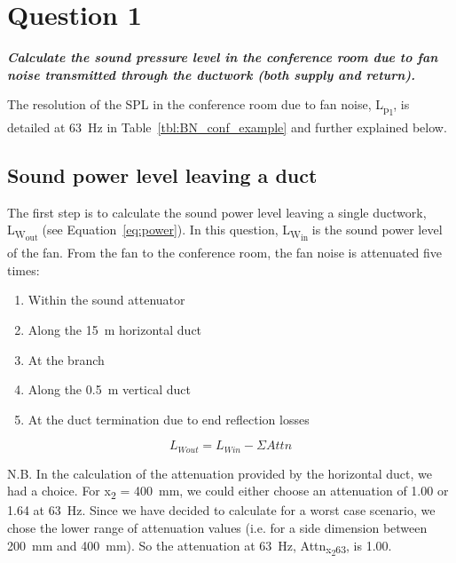 \section{Question 1}

\textbf{\textit{Calculate the sound pressure level in the conference room due to fan noise transmitted through the ductwork (both supply and return).}}


The resolution of the SPL in the conference room due to fan noise, L\textsubscript{p\textsubscript{1}}, is detailed at 63~Hz in Table~\ref{tbl:BN_conf_example} and further explained below.


\subsection{Sound power level leaving a duct}

The first step is to calculate the sound power level leaving a single ductwork, L\textsubscript{W\textsubscript{out}} (see Equation~\ref{eq:power}).
In this question, L\textsubscript{W\textsubscript{in}} is the sound power level of the fan.
From the fan to the conference room, the fan noise is attenuated five times:
\begin{enumerate}
	\item Within the sound attenuator
	\item Along the 15~m horizontal duct
	\item At the branch
	\item Along the 0.5~m vertical duct
	\item At the duct termination due to end reflection losses
\end{enumerate}

    \begin{equation}\label{eq:power}
		L_{W out} = L_{W in} - \Sigma Attn
	\end{equation}

N.B. In the calculation of the attenuation provided by the horizontal duct, we had a choice.
For x\textsubscript{2} = 400~mm, we could either choose an attenuation of 1.00 or 1.64 at 63~Hz.
Since we have decided to calculate for a worst case scenario, we chose the lower range of attenuation values (i.e. for a side dimension between 200~mm and 400~mm).
So the attenuation at 63~Hz, Attn\textsubscript{x\textsubscript{2}63}, is 1.00.



